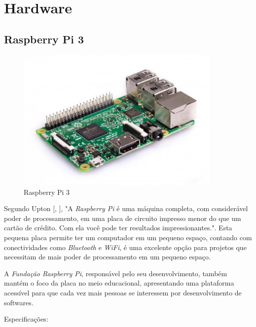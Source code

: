 \documentclass[
	12pt,				%
	oneside,			%
	a4paper,			%
	brazil				%
]{abntex2}
\newcommand{\citecustom}[1]{[\citeauthoronline{#1}, \citeyear{#1}]}
\begin{document}
{\newpage

\section{Hardware}

\subsection{Raspberry Pi 3}

\begin{figure}[!h]
\centering
\includegraphics[width=10cm, center]{images/raspberry-pi}
\caption{Raspberry Pi 3}
\label{Rotulo}
\end{figure}

Segundo Upton \citecustom{Upton2017}, "A \textit{Raspberry Pi} é uma máquina completa, com considerável poder de processamento, em uma placa de circuito impresso menor do que um cartão de crédito. Com ela você pode ter resultados impressionantes.". Esta pequena placa permite ter um computador em um pequeno espaço, contando com conectividades como \textit{Bluetooth} e \textit{WiFi}, é uma excelente opção para projetos que necessitam de mais poder de processamento em um pequeno espaço. 

A \textit{Fundação Raspberry Pi}, responsável pelo seu desenvolvimento, também mantém o foco da placa no meio educacional, apresentando uma plataforma acessível para que cada vez mais pessoas se interessem por desenvolvimento de softwares.

Especificações:

}
\end{document}
